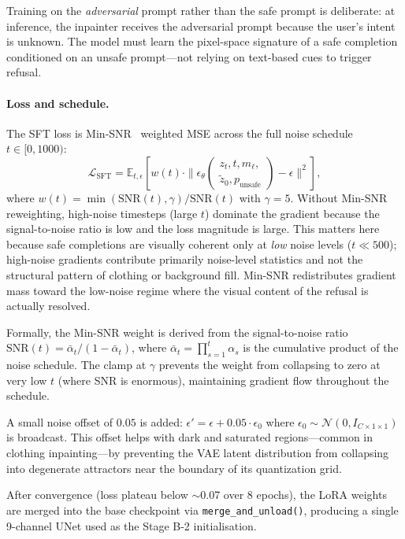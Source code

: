 Training on the \emph{adversarial} prompt rather than the safe prompt is
deliberate: at inference, the inpainter receives the adversarial prompt
because the user's intent is unknown.
The model must learn the pixel-space signature of a safe completion
conditioned on an unsafe prompt---not relying on text-based cues to trigger
refusal.

\paragraph{Loss and schedule.}
The SFT loss is Min-SNR~\cite{hang2023minsnr} weighted MSE across the full
noise schedule $t \in [0, 1000)$:
\[
  \mathcal{L}_\text{SFT} = \mathbb{E}_{t,\epsilon}\!\left[
    w(t)\cdot
    \|\epsilon_\theta(\begin{aligned}z_t, t, m_\ell, \\ \tilde{z}_0, p_\text{unsafe} \end{aligned}) 
     - \epsilon\|^2
  \right],
  \label{eq:sft_loss}
\]
where $w(t) = \min(\text{SNR}(t), \gamma)/\text{SNR}(t)$ with $\gamma{=}5$.
Without Min-SNR reweighting, high-noise timesteps (large $t$) dominate the
gradient because the signal-to-noise ratio is low and the loss magnitude is
large.
This matters here because safe completions are visually coherent only at
\emph{low} noise levels ($t \ll 500$); high-noise gradients contribute
primarily noise-level statistics and not the structural pattern of
clothing or background fill.
Min-SNR redistributes gradient mass toward the low-noise regime where the
visual content of the refusal is actually resolved.

Formally, the Min-SNR weight is derived from the signal-to-noise ratio
$\text{SNR}(t) = \bar\alpha_t / (1 - \bar\alpha_t)$, where
$\bar\alpha_t = \prod_{s=1}^t \alpha_s$ is the cumulative product of the
noise schedule.
The clamp at $\gamma$ prevents the weight from collapsing to zero at very
low $t$ (where SNR is enormous), maintaining gradient flow throughout the
schedule.

A small noise offset of $0.05$ is added:
$\epsilon' = \epsilon + 0.05 \cdot \epsilon_0$ where $\epsilon_0 \sim
\mathcal{N}(0, I_{C \times 1 \times 1})$ is broadcast.
This offset helps with dark and saturated regions---common in clothing
inpainting---by preventing the VAE latent distribution from collapsing into
degenerate attractors near the boundary of its quantization grid.

After convergence (loss plateau below $\sim$0.07 over 8 epochs), the LoRA
weights are merged into the base checkpoint via \texttt{merge\_and\_unload()},
producing a single 9-channel UNet used as the Stage B-2 initialisation.

